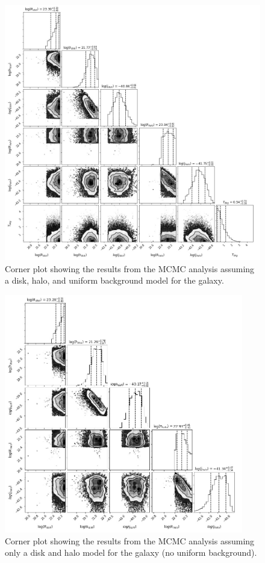 \documentclass[letterpaper, 10pt]{article}
\begin{document}
\begin{figure}[H]
\begin{center}
\includegraphics[width=\textwidth]{corner_disk+halo+bkg.jpg}
\caption{Corner plot showing the results from the MCMC analysis assuming a disk, halo, and uniform background model for the galaxy.}
\label{corner_disk+halo+bkg}
\end{center}
\end{figure}

\newpage

\begin{figure}[H]
\begin{center}
\includegraphics[width=0.93\textwidth]{corner_disk+halo.jpg}
\caption{Corner plot showing the results from the MCMC analysis assuming only a disk and halo model for the galaxy (no uniform background).}
\label{corner_disk+halo}
\end{center}
\end{figure}
\end{document}
